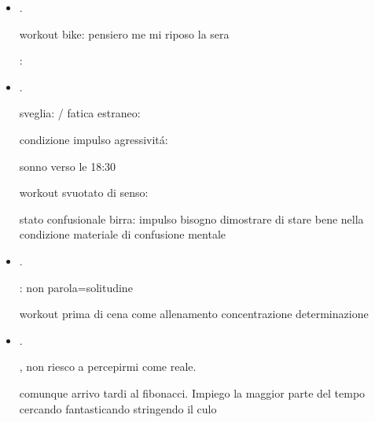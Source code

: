 \begin{itemize}
mattina-latte-sonno: sono me per sempre

haumea

non ricordo che cazzo ho fatto: .

workout pike/pizza niente caf\'e sono in coma
sedile fino alle 8 tenda fino alle 11

\item {}.

workout bike: pensiero me mi riposo la sera


: 



\item {}.

sveglia: / fatica estraneo: 

condizione impulso agressivit\'a: 

sonno verso le 18:30

workout svuotato di senso: 

stato confusionale birra: impulso bisogno dimostrare di stare bene nella condizione materiale di confusione mentale


\item {}.



: non parola=solitudine

workout prima di cena come allenamento concentrazione determinazione

\item {}.

, non riesco a percepirmi come reale.

comunque arrivo tardi al fibonacci. Impiego la maggior parte del tempo cercando fantasticando stringendo il culo


\end{itemize}
